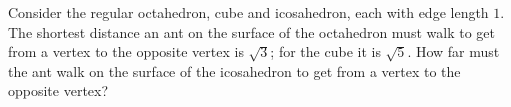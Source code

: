 Consider the regular octahedron, cube and icosahedron, each with edge length $1$. The shortest distance an ant on the surface of the octahedron must walk to get from a vertex to the opposite vertex is $\sqrt3$; for the cube it is $\sqrt5$. How far must the ant walk on the surface of the icosahedron to get from a vertex to the opposite vertex?
